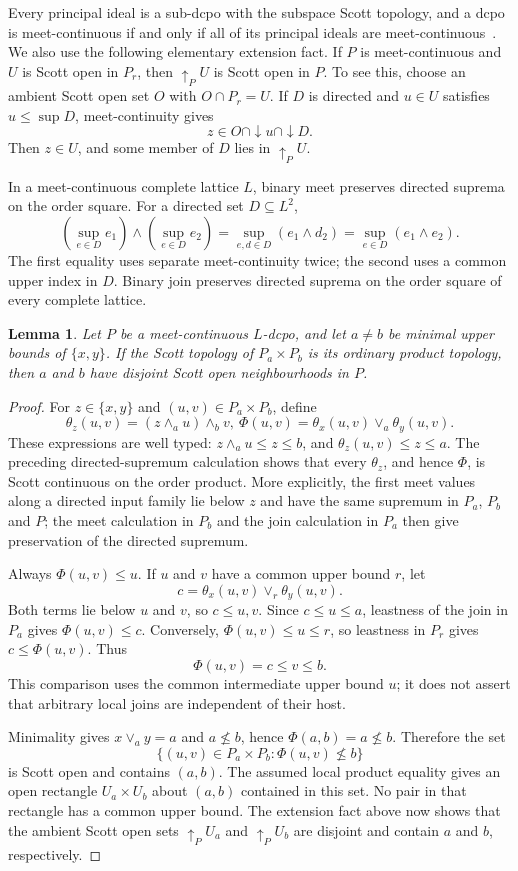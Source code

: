 \documentclass[10pt,a4paper]{article}
\newtheorem{lemma}[theorem]{Lemma}
\theoremstyle{definition}
\begin{document}
Every principal ideal is a sub-dcpo with the subspace Scott topology, and a dcpo is meet-continuous if and only if all of its principal ideals are meet-continuous~\cite[Lemma~3.2]{Xu}. We also use the following elementary extension fact. If $P$ is meet-continuous and $U$ is Scott open in $P_r$, then ${\uparrow}_P U$ is Scott open in $P$. To see this, choose an ambient Scott open set $O$ with $O\cap P_r=U$. If $D$ is directed and $u\in U$ satisfies $u\leq\sup D$, meet-continuity gives
\[
 z\in O\cap{\downarrow} u\cap{\downarrow}D.
\]
Then $z\in U$, and some member of $D$ lies in ${\uparrow}_P U$.

In a meet-continuous complete lattice $L$, binary meet preserves directed suprema on the order square. For a directed set $D\subseteq L^2$,
\[
 \left(\sup_{e\in D}e_1\right)\wedge
 \left(\sup_{e\in D}e_2\right)
 =\sup_{e,d\in D}(e_1\wedge d_2)
 =\sup_{e\in D}(e_1\wedge e_2).
\]
The first equality uses separate meet-continuity twice; the second uses a common upper index in $D$. Binary join preserves directed suprema on the order square of every complete lattice.

\begin{lemma}\label{local:separate}
Let $P$ be a meet-continuous $L$-dcpo, and let $a\neq b$ be minimal upper bounds of $\{x,y\}$. If the Scott topology of $P_a\times P_b$ is its ordinary product topology, then $a$ and $b$ have disjoint Scott open neighbourhoods in $P$.
\end{lemma}
\begin{proof}
For $z\in\{x,y\}$ and $(u,v)\in P_a\times P_b$, define
\[
 \theta_z(u,v)=(z\wedge_a u)\wedge_b v,
 ~
 \Phi(u,v)=\theta_x(u,v)\vee_a\theta_y(u,v).
\]
These expressions are well typed: $z\wedge_a u\leq z\leq b$, and $\theta_z(u,v)\leq z\leq a$. The preceding directed-supremum calculation shows that every $\theta_z$, and hence $\Phi$, is Scott continuous on the order product. More explicitly, the first meet values along a directed input family lie below $z$ and have the same supremum in $P_a$, $P_b$ and $P$; the meet calculation in $P_b$ and the join calculation in $P_a$ then give preservation of the directed supremum.

Always $\Phi(u,v)\leq u$. If $u$ and $v$ have a common upper bound $r$, let
\[
 c=\theta_x(u,v)\vee_r\theta_y(u,v).
\]
Both terms lie below $u$ and $v$, so $c\leq u,v$. Since $c\leq u\leq a$, leastness of the join in $P_a$ gives $\Phi(u,v)\leq c$. Conversely, $\Phi(u,v)\leq u\leq r$, so leastness in $P_r$ gives $c\leq\Phi(u,v)$. Thus
\[
 \Phi(u,v)=c\leq v\leq b.
\]
This comparison uses the common intermediate upper bound $u$; it does not assert that arbitrary local joins are independent of their host.

Minimality gives $x\vee_a y=a$ and $a\nleq b$, hence $\Phi(a,b)=a\nleq b$. Therefore the set
\[
 \{(u,v)\in P_a\times P_b:\Phi(u,v)\nleq b\}
\]
is Scott open and contains $(a,b)$. The assumed local product equality gives an open rectangle $U_a\times U_b$ about $(a,b)$ contained in this set. No pair in that rectangle has a common upper bound. The extension fact above now shows that the ambient Scott open sets ${\uparrow}_P U_a$ and ${\uparrow}_P U_b$ are disjoint and contain $a$ and $b$, respectively.
\end{proof}
\end{document}
